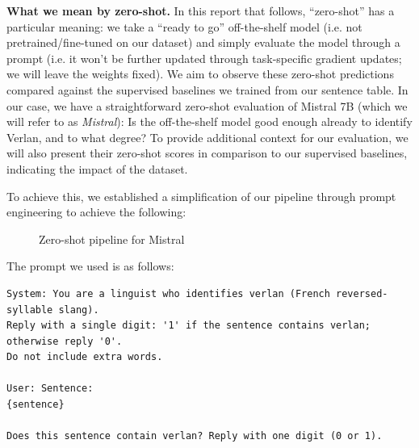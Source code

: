 \documentclass[12pt]{article}
\begin{document}
\textbf{What we mean by zero-shot.} In this report that follows, ``zero-shot'' has a particular meaning: we take a ``ready to go'' off-the-shelf model (i.e. not pretrained/fine-tuned on our dataset) and simply evaluate the model through a prompt (i.e. it won't be further updated through task-specific gradient updates; we will leave the weights fixed). We aim to observe these zero-shot predictions compared against the supervised baselines we trained from our sentence table. In our case, we have a straightforward zero-shot evaluation of Mistral 7B (which we will refer to as \textit{Mistral}): Is the off-the-shelf model good enough already to identify Verlan, and to what degree? To provide additional context for our evaluation, we will also present their zero-shot scores in comparison to our supervised baselines, indicating the impact of the dataset. 

To achieve this, we established a simplification of our pipeline through prompt engineering to achieve the following:

\begin{figure}[H]
    \centering
    \caption{Zero-shot pipeline for Mistral}
    \label{fig:mistral-zeroshot-pipeline}
\end{figure}

The prompt we used is as follows:

\begin{lstlisting}
System: You are a linguist who identifies verlan (French reversed-syllable slang).
Reply with a single digit: '1' if the sentence contains verlan; otherwise reply '0'.
Do not include extra words.

User: Sentence:
{sentence}

Does this sentence contain verlan? Reply with one digit (0 or 1).
\end{lstlisting}
\end{document}

